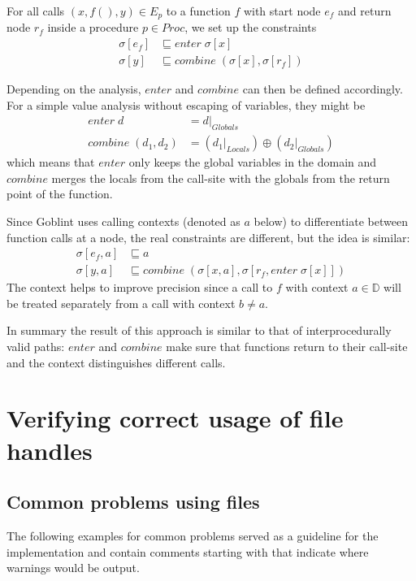 For all calls $(x,f(),y) \in E_p$ to a function $f$ with start node $e_f$ and return node $r_f$ inside a procedure $p \in Proc$, we set up the constraints
\begin{align}
\sigma[e_f] &\sqsubseteq enter \; \sigma[x]\\
\sigma[y] 	&\sqsubseteq combine \; (\sigma[x], \sigma[r_f])
\end{align}

Depending on the analysis, $enter$ and $combine$ can then be defined accordingly. For a simple value analysis without escaping of variables, they might be
\begin{align}
enter \; d &= d|_{Globals}\\
combine \; (d_1, d_2) &= (d_1|_{Locals}) \oplus (d_2|_{Globals})
\end{align}
which means that $enter$ only keeps the global variables in the domain and $combine$ merges the locals from the call-site with the globals from the return point of the function.

Since Goblint uses calling contexts (denoted as $a$ below) to differentiate between function calls at a node, the real constraints are different, but the idea is similar:
\begin{align}
\sigma[e_f, a]	&\sqsubseteq a\\
\sigma[y, a]	&\sqsubseteq combine \; (\sigma[x, a], \sigma[r_f, enter \; \sigma[x]])
\end{align}
The context helps to improve precision since a call to $f$ with context $a \in \mathbb{D}$ will be treated separately from a call with context $b \neq a$.

In summary the result of this approach is similar to that of interprocedurally valid paths: $enter$ and $combine$ make sure that functions return to their call-site and the context distinguishes different calls.


\chapter{Verifying correct usage of file handles}
\label{chap:file}
\section{Common problems using files}
The following examples for common problems served as a guideline for the implementation and contain comments starting with  that indicate where warnings would be output.

